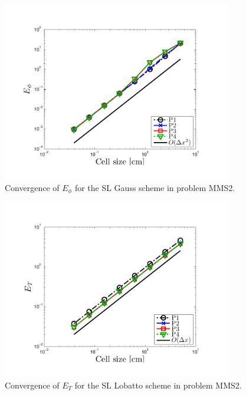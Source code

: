 \begin{figure}[!htp]
\centering
\includegraphics[width=10cm,trim=0.25in  0.25in 0.75in 0.5in,clip=true]{chapter6_grey_radtran/Dissertation_Data/MMS3_Constant_XS_SL_Gauss_phi_L2.pdf}
\caption{Convergence of $E_{\phi}$ for the SL Gauss scheme in problem MMS2.}
\label{fig:mms3_constant_gauss_phi}
\end{figure}
\begin{figure}[!hbp]
\centering
\includegraphics[width=10cm,trim=0.25in  0.2in 0.75in 0.5in,clip=true]{chapter6_grey_radtran/Dissertation_Data/MMS3_Constant_XS_SL_Lobatto_temp_L2.pdf}
\caption{Convergence of $E_{T}$ for the SL Lobatto scheme in problem MMS2.}
\label{fig:mms3_constant_lobatto_temp}
\end{figure}
%
%
